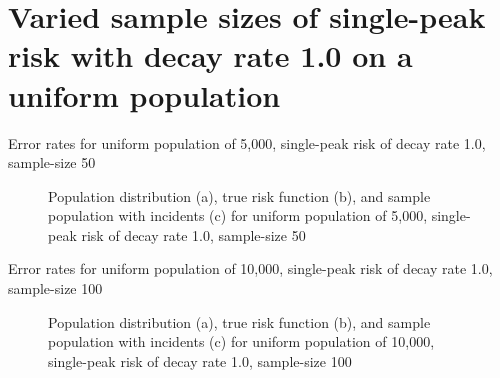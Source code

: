 \section{Varied sample sizes of single-peak risk with decay rate 1.0 on a uniform population}
\label{sec:app:results_unifXk_X_1.0_1h}

\graphicspath{{./results/unif5k_50_1.0_1h/}}
\makeatletter
{}
\makeatother

\begin{table}[H]
    
    \caption[]{Error rates for uniform population of 5,000, single-peak risk of decay rate 1.0, sample-size 50}
    \label{tab:mean_error_rates:unif5k_50_1.0_1h}
\end{table}

\begin{figure}[H]
    
    \caption[]{Population distribution (a), true risk function (b), and sample population with incidents (c) for uniform population of 5,000, single-peak risk of decay rate 1.0, sample-size 50}
    \label{fig:distributions:unif5k_50_1.0_1h}    
\end{figure}

\graphicspath{{./results/unif10k_100_1.0_1h/}}
\makeatletter
{}
\makeatother

\begin{table}[H]
    
    \caption[]{Error rates for uniform population of 10,000, single-peak risk of decay rate 1.0, sample-size 100}
    \label{tab:mean_error_rates:unif10k_100_1.0_1h}
\end{table}

\begin{figure}[H]
    
    \caption[]{Population distribution (a), true risk function (b), and sample population with incidents (c) for uniform population of 10,000, single-peak risk of decay rate 1.0, sample-size 100}
    \label{fig:distributions:unif10k_100_1.0_1h}    
\end{figure}


\graphicspath{{./results/unif20k_200_1.0_1h/}}
\makeatletter
{}
\makeatother

